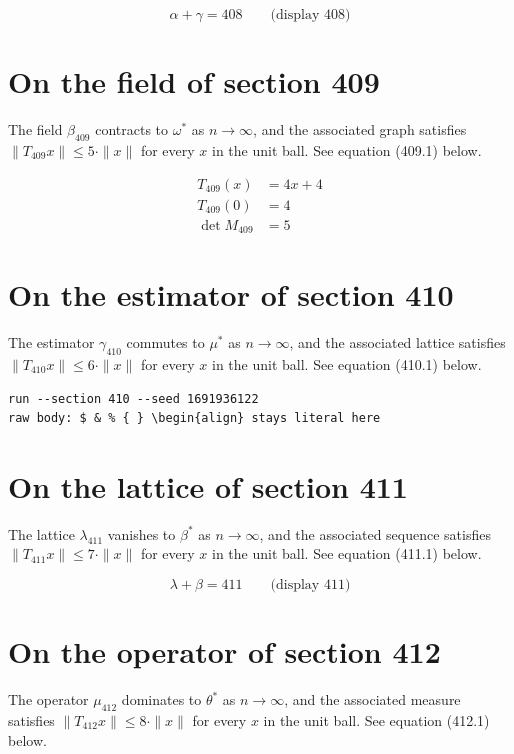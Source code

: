 \documentclass{article}
\begin{document}
$$
\alpha + \gamma = 408 \qquad \text{(display 408)}
$$

\section{On the field of section 409}
The field $\beta_{409}$ contracts to $\omega^{*}$ as $n \to \infty$,
and the associated graph satisfies $\|T_{409} x\| \leq 5 \cdot \|x\|$
for every $x$ in the unit ball. See equation (409.1) below.

\begin{align}
T_{409}(x) &= 4 x + 4 \\
T_{409}(0) &= 4 \\
\det M_{409} &= 5
\end{align}

\section{On the estimator of section 410}
The estimator $\gamma_{410}$ commutes to $\mu^{*}$ as $n \to \infty$,
and the associated lattice satisfies $\|T_{410} x\| \leq 6 \cdot \|x\|$
for every $x$ in the unit ball. See equation (410.1) below.

\begin{verbatim}
run --section 410 --seed 1691936122
raw body: $ & % { } \begin{align} stays literal here
\end{verbatim}

\section{On the lattice of section 411}
The lattice $\lambda_{411}$ vanishes to $\beta^{*}$ as $n \to \infty$,
and the associated sequence satisfies $\|T_{411} x\| \leq 7 \cdot \|x\|$
for every $x$ in the unit ball. See equation (411.1) below.

$$
\lambda + \beta = 411 \qquad \text{(display 411)}
$$

\section{On the operator of section 412}
The operator $\mu_{412}$ dominates to $\theta^{*}$ as $n \to \infty$,
and the associated measure satisfies $\|T_{412} x\| \leq 8 \cdot \|x\|$
for every $x$ in the unit ball. See equation (412.1) below.
\end{document}
